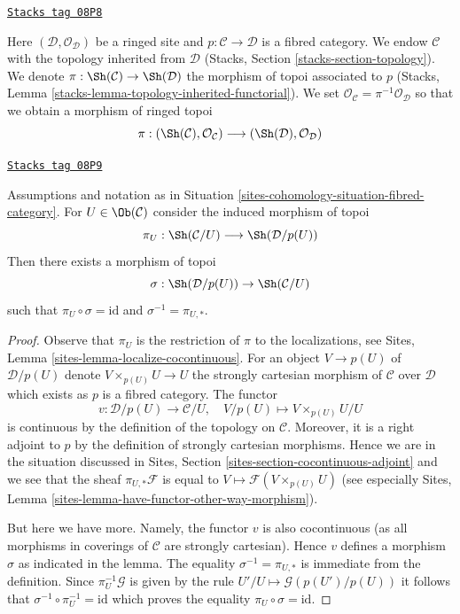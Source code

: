 \begin{definition}
\label{sites-cohomology-situation-fibred-category}
\href{https://stacks.math.columbia.edu/tag/08P8}{\texttt{Stacks tag 08P8}}

Here $(\mathcal{D}, \mathcal{O}_\mathcal{D})$ be a ringed site
and $p : \mathcal{C} \to \mathcal{D}$ is a fibred category. We endow
$\mathcal{C}$ with the topology inherited from $\mathcal{D}$
(Stacks, Section \ref{stacks-section-topology}). We denote
$\pi : \Sh(\mathcal{C}) \to \Sh(\mathcal{D})$ the morphism of
topoi associated to $p$
(Stacks, Lemma \ref{stacks-lemma-topology-inherited-functorial}).
We set $\mathcal{O}_\mathcal{C} = \pi^{-1}\mathcal{O}_\mathcal{D}$
so that we obtain a morphism of ringed topoi
$$
\pi :
(\Sh(\mathcal{C}), \mathcal{O}_\mathcal{C})
\longrightarrow
(\Sh(\mathcal{D}), \mathcal{O}_\mathcal{D})
$$
\end{definition}

\begin{lemma}
\label{sites-cohomology-lemma-fibred-category-with-object}
\href{https://stacks.math.columbia.edu/tag/08P9}{\texttt{Stacks tag 08P9}}

Assumptions and notation as in Situation \ref{sites-cohomology-situation-fibred-category}.
For $U \in \Ob(\mathcal{C})$ consider the induced morphism
of topoi
$$
\pi_U : \Sh(\mathcal{C}/U) \longrightarrow \Sh(\mathcal{D}/p(U))
$$
Then there exists a morphism of topoi
$$
\sigma : \Sh(\mathcal{D}/p(U)) \to \Sh(\mathcal{C}/U)
$$
such that $\pi_U \circ \sigma = \text{id}$ and $\sigma^{-1} = \pi_{U, *}$.
\end{lemma}

\begin{proof}
Observe that $\pi_U$ is the restriction of $\pi$ to the localizations, see
Sites, Lemma \ref{sites-lemma-localize-cocontinuous}.
For an object $V \to p(U)$ of $\mathcal{D}/p(U)$ denote
$V \times_{p(U)} U \to U$ the strongly cartesian morphism of $\mathcal{C}$
over $\mathcal{D}$ which exists as $p$ is a fibred category.
The functor
$$
v : \mathcal{D}/p(U) \to \mathcal{C}/U,\quad
V/p(U) \mapsto V \times_{p(U)} U/U
$$
is continuous by the definition of the topology on $\mathcal{C}$.
Moreover, it is a right adjoint to $p$ by the definition of strongly
cartesian morphisms. Hence we are in the situation discussed in
Sites, Section \ref{sites-section-cocontinuous-adjoint}
and we see that the sheaf $\pi_{U, *}\mathcal{F}$
is equal to $V \mapsto \mathcal{F}(V \times_{p(U)} U)$
(see especially Sites, Lemma
\ref{sites-lemma-have-functor-other-way-morphism}).

\medskip\noindent
But here we have more. Namely, the functor $v$
is also cocontinuous (as all morphisms in coverings of $\mathcal{C}$
are strongly cartesian). Hence $v$ defines a morphism $\sigma$ as
indicated in the lemma. The equality $\sigma^{-1} = \pi_{U, *}$
is immediate from the definition. Since $\pi_U^{-1}\mathcal{G}$
is given by the rule $U'/U \mapsto \mathcal{G}(p(U')/p(U))$
it follows that $\sigma^{-1} \circ \pi_U^{-1} = \text{id}$
which proves the equality
$\pi_U \circ \sigma = \text{id}$.
\end{proof}

